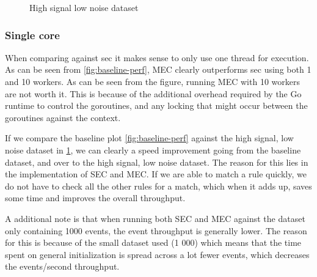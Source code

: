 \begin{figure}[htbp]
\centering
{}
\caption{High signal low noise dataset}
\label{fig:high-signal-low-noise}
\end{figure}

\subsubsection{Single core}

When comparing against \acrshort{sec} it makes sense to only use one thread for execution. As can be seen from \cref{fig:baseline-perf}, MEC clearly outperforms \acrshort{sec} using both 1 and 10 workers. As can be seen from the figure, running MEC with 10 workers are not worth it. This is because of the additional overhead required by the Go runtime to control the goroutines, and any locking that might occur between the goroutines against the context.

If we compare the baseline plot \cref{fig:baseline-perf} against the high signal, low noise dataset in \cref{fig:high-signal-low-noise}, we can clearly a speed improvement going from the baseline dataset, and over to the high signal, low noise dataset. The reason for this lies in the implementation of SEC and MEC. If we are able to match a rule quickly, we do not have to check all the other rules for a match, which when it adds up, saves some time and improves the overall throughput.

A additional note is that when running both SEC and MEC against the dataset only containing 1000 events, the event throughput is generally lower. The reason for this is because of the small dataset used (1 000) which means that the time spent on general initialization is spread across a lot fewer events, which decreases the events/second throughput.

